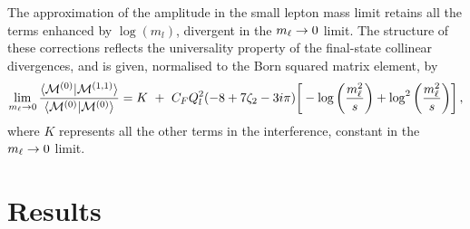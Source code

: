 \documentclass[11pt,a4paper]{article}
\begin{document}
The approximation of the amplitude in the small lepton mass limit
retains all the terms enhanced by $\log (m_l)$,
divergent in the $m_\ell\to 0$ limit.
The structure of these corrections reflects the universality property
of the final-state collinear divergences,
and is given, normalised to the Born squared matrix element, by
% 
\begin{equation}
  \lim_{\ml\to0}
  \frac{\langle \M^{(0)} | \M^{(1,1)} \rangle}{\langle \M^{(0)} | \M^{(0)}\rangle}=
K~+~
%
 C_F Q_l^2 ( -8+7 \zeta_2 - 3 i \pi )
\bigg[ - \log \bigg( \frac{\ml^2}{s} \bigg)
       + \log^2  \bigg( \frac{\ml^2}{s} \bigg)
\bigg] \,,
\end{equation}
where $K$ represents all the other terms in the interference,
constant in the $m_\ell\to 0$ limit.

\section{Results}
\label{sec:results}
%
\end{document}
